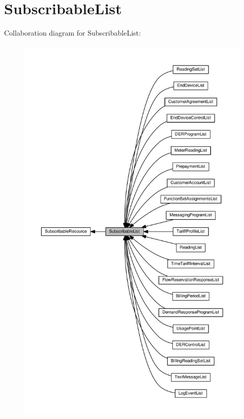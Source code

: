 \hypertarget{group__SubscribableList}{}\section{Subscribable\+List}
\label{group__SubscribableList}
Collaboration diagram for Subscribable\+List\+:\nopagebreak
\begin{figure}[H]
\begin{center}
\leavevmode
\includegraphics[height=550pt]{group__SubscribableList}
\end{center}
\end{figure}
